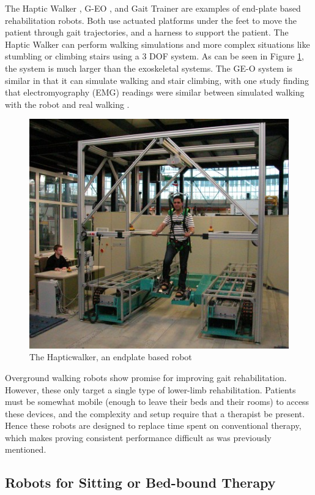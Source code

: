 \documentclass[12pt]{report}
\begin{document}
	
	The Haptic Walker \cite{Schmidt2005}, G-EO \cite{Hesse2010}, and Gait Trainer \cite{Hesse} are examples of end-plate based rehabilitation robots. Both use actuated platforms under the feet to move the patient through gait trajectories, and a harness to support the patient. The Haptic Walker can perform walking simulations and more complex situations like stumbling or climbing stairs using a 3 DOF system. As can be seen in Figure \ref{fig:Hapticwalker}, the system is much larger than the exoskeletal systems. The GE-O system is similar in that it can simulate walking and stair climbing, with one study finding that electromyography (EMG) readings were similar between simulated walking with the robot and real walking \cite{Hesse2010}. 
	
	\begin{figure}[h] 
		\centering
		\includegraphics[width=0.75\linewidth]{Hapticwalker}
		\caption{The Hapticwalker, an endplate based robot}
		\label{fig:Hapticwalker}
	\end{figure}
	
	Overground walking robots show promise for improving gait rehabilitation. However, these only target a single type of lower-limb rehabilitation. Patients must be somewhat mobile (enough to leave their beds and their rooms) to access these devices, and the complexity and setup require that a therapist be present. Hence these robots are designed to replace time spent on conventional therapy, which makes proving consistent performance difficult as was previously mentioned.  
	
	\subsection{Robots for Sitting or Bed-bound Therapy}
	
\end{document}

